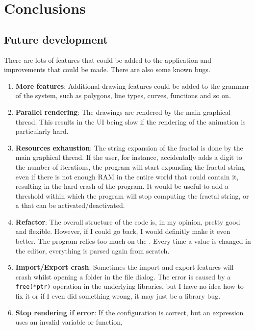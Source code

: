 \documentclass[a4paper]{article}
\begin{document}
\pagebreak

\section{Conclusions}

\subsection{Future development}

There are lots of features that could be added to the application
and improvements that could be made.
There are also some known bugs.

\begin{enumerate}
    \item \textbf{More features}: Additional drawing features could be added to the grammar
    of the system, such as polygons, line types, curves, functions and so on.
    \item \textbf{Parallel rendering}: The drawings are rendered by the main graphical thread.
    This results in the UI being slow if the rendering of the animation is particularly hard.
    \item \textbf{Resources exhaustion}: The string expansion of the fractal is done by the main graphical thread.
    If the user, for instance, accidentally adds a digit to the number of iterations, the program
    will start expanding the fractal string even if there is not enough RAM in the entire world
    that could contain it, resulting in the hard crash of the program.
    It would be useful to add a threshold within which the program will stop computing the fractal string,
    or a  that can be activated/deactivated.
    \item \textbf{Refactor}: The overall structure of the code is, in my opinion, pretty good and flexible.
    However, if I could go back, I would definitly make it even better. The program relies too much on the
    . Every time a value is changed in the editor, everything is parsed again from scratch.
    \item \textbf{Import/Export crash}: Sometimes the import and export features will crash whilst opening a folder in the file dialog.
    The error is caused by a \texttt{free(*ptr)} operation in the underlying libraries, but I have no idea how to fix it or
    if I even did something wrong, it may just be a library bug.
    \item \textbf{Stop rendering if error}: If the configuration is correct, but an expression uses an invalid variable or function,

\end{enumerate}
\end{document}
